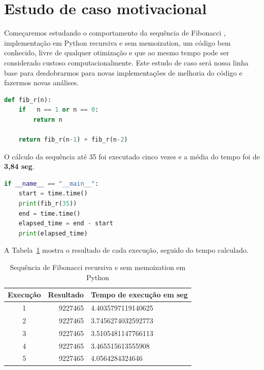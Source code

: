 \documentclass[sigconf]{acmart}
\begin{document}
\section{Estudo de caso motivacional}
Começaremos estudando o comportamento da sequência de Fibonacci \cite{mathsisfun2020fibonacci}, implementação em Python recursiva e sem memoization, um código bem conhecido, livre de qualquer otimização e que ao mesmo tempo pode ser considerado custoso computacionalmente. Este estudo de caso será nossa linha base para desdobrarmos para novas implementações de melhoria do código e fazermos novas análises. 
\renewcommand{\lstlistingname}{Trecho de código}
\begin{lstlisting}[language=Python, caption=Sequência de Fibonacci recursiva sem memoization]
def fib_r(n):
    if   n == 1 or n == 0:
        return n

    return fib_r(n-1) + fib_r(n-2)
\end{lstlisting}

O cálculo da sequência até 35 foi executado cinco vezes e a média do tempo foi de \textbf{3,84 seg}.

\renewcommand{\lstlistingname}{Trecho de código}
\begin{lstlisting}[language=Python, caption=Chamada da Sequência de Fibonacci recursiva sem memoization]
if __name__ == "__main__":
    start = time.time()
    print(fib_r(35))
    end = time.time()
    elapsed_time = end - start
    print(elapsed_time)
\end{lstlisting}

A Tabela~\ref{tab:fibrscache} mostra o resultado de cada execução, seguido do tempo calculado.

\begin{table}[H]
  \caption{Sequência de Fibonacci recursiva e sem memoization em Python}
  \label{tab:fibrscache}
  \begin{tabular}{crl}
    \toprule
    Execução & Resultado & Tempo de execução em seg\\
    \midrule
    1 & 9227465 & 4.4035797119140625\\
    2 & 9227465 & 3.7456274032592773\\
    3 & 9227465 & 3.5105481147766113\\
    4 & 9227465 & 3.465515613555908\\
    5 & 9227465 & 4.0564284324646\\
  \bottomrule
\end{tabular}
\end{table}
\end{document}
